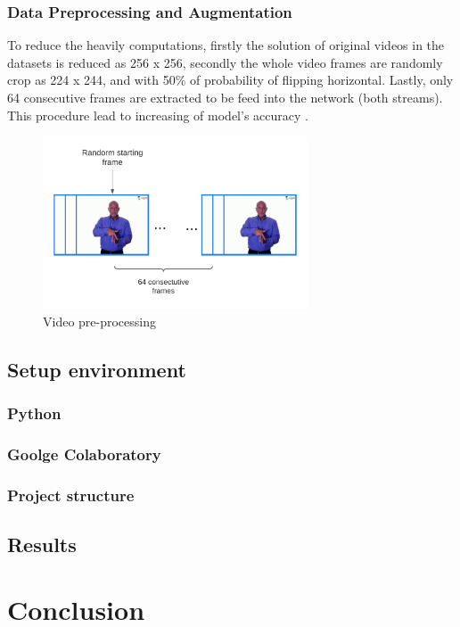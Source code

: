 \documentclass[a4paper, 12pt]{article}
\begin{document}
\subsubsection{Data Preprocessing and Augmentation}
To reduce the heavily computations, firstly the solution of original videos in the datasets is reduced as 256 x 256, secondly the whole video frames are randomly crop as 224 x 244, and with 50\% of probability of flipping horizontal. Lastly, only 64 consecutive frames are extracted to be feed into the network (both streams). This procedure lead to increasing of model's accuracy \citep{li2020word}.

\begin{figure}[H]
    \centering
    \includegraphics[width=0.7\textwidth]{data pre-processing.png}
    \caption{Video pre-processing}
    \label{fig:data preprocessing}
\end{figure}

\subsection{Setup environment}
\subsubsection{Python}
\subsubsection{Goolge Colaboratory}
\subsubsection{Project structure}
\subsection{Results}

\section{Conclusion}


\newpage

\newpage


\end{document}
